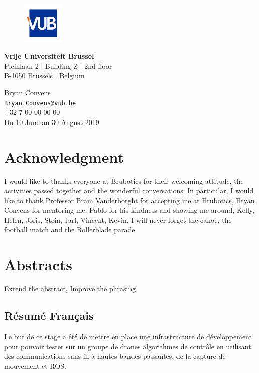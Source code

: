 \begin{titlepage}
 \vfill
 \begin{figure}[h!]
  \hspace{0.29cm}
  \includegraphics[width=2cm]{logos/vub_logo.jpg}
 \end{figure}
 \begin{minipage}{8cm}
  \textbf{Vrije Universiteit Brussel}\\
  Pleinlaan 2 | Building Z | 2nd floor\\
  B-1050 Brussels | Belgium
 \end{minipage} \hfill
 \begin{minipage}{7cm}
  \begin{flushright}
   Bryan Convens\\
   \texttt{Bryan.Convens@vub.be}\\
   +32 7 00 00 00 00\\ \vspace{0.2cm}
   Du 10 June au 30 August 2019
  \end{flushright}
 \end{minipage}

\end{titlepage}


\chapter*{Acknowledgment}
I would like to thanks everyone at Brubotics for their welcoming attitude,
the activities passed together and the wonderful conversations.
In particular, I would like to thank Professor Bram Vanderborght for accepting me at Brubotics,
Bryan Convens for mentoring me, Pablo for his kindness and showing me around,
Kelly, Helen, Joris, Stein, Jarl, Vincent, Kevin, I will never forget the canoe, the football match and the Rollerblade parade.

\chapter*{Abstracts}
{\color{red}Extend the abstract, Improve the phrasing}
\section*{Résumé Français}
Le but de ce stage a été de mettre en place une infrastructure de développement pour pouvoir tester sur un groupe de drones algorithmes de contrôle en utilisant des communications sans fil à hautes bandes passantes, de la capture de mouvement et ROS.

